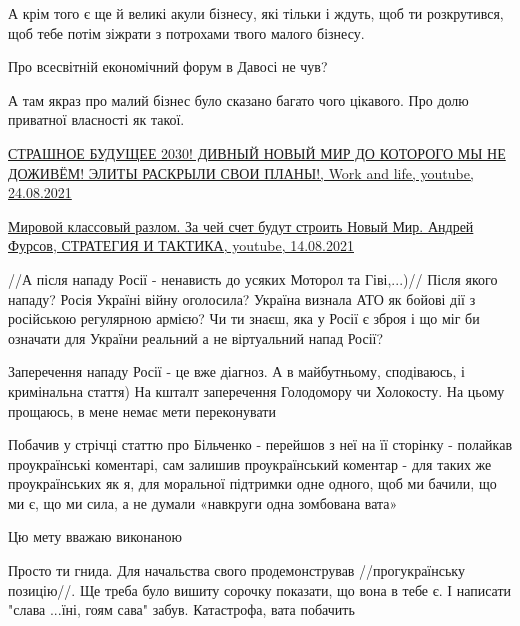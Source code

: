 \begin{itemize}
\begin{itemize}
А крім того є ще й великі акули бізнесу, які тільки і ждуть, щоб ти
розкрутився, щоб тебе потім зіжрати з потрохами твого малого бізнесу.

Про всесвітній економічний форум в Давосі не чув?

А там якраз про малий бізнес було сказано багато чого цікавого. Про долю
приватної власності як такої.

\href{https://youtu.be/9WFCkMUCHr4}{%
СТРАШНОЕ БУДУЩЕЕ 2030! ДИВНЫЙ НОВЫЙ МИР ДО КОТОРОГО МЫ НЕ ДОЖИВЁМ! ЭЛИТЫ РАСКРЫЛИ СВОИ ПЛАНЫ!, %
Work and life, youtube, 24.08.2021%
}

\href{https://youtu.be/DUr18NJBkQo}{%
Мировой классовый разлом. За чей счет будут строить Новый Мир. Андрей Фурсов, %
СТРАТЕГИЯ И ТАКТИКА, youtube, 14.08.2021%
}

 

//А після нападу Росії - ненависть до усяких Моторол та Гіві,...)//
Після якого нападу?
Росія Україні війну оголосила?
Україна визнала АТО як бойові дії з російською регулярною армією?
Чи ти знаєш, яка у Росії є зброя і що міг би означати для України реальний а не віртуальний напад Росії?


Заперечення нападу Росії - це вже діагноз. А в майбутньому, сподіваюсь, і
кримінальна стаття) На кшталт заперечення Голодомору чи Холокосту.
На цьому прощаюсь, в мене немає мети переконувати

Побачив у стрічці статтю про Більченко - перейшов з неї на її сторінку -
полайкав проукраїнські коментарі, сам залишив проукраїнський коментар - для
таких же проукраїнських як я, для моральної підтримки одне одного, щоб ми
бачили, що ми є, що ми сила, а не думали «навкруги одна зомбована вата»

Цю мету вважаю виконаною

 
Просто ти гнида.
Для начальства свого продемонстрував
//прогукраїнську позицію//.
Ще треба було вишиту сорочку показати, що вона в тебе є. І написати "слава ...їні, гоям сава" забув.
Катастрофа, вата побачить


\end{itemize}
\end{itemize}
